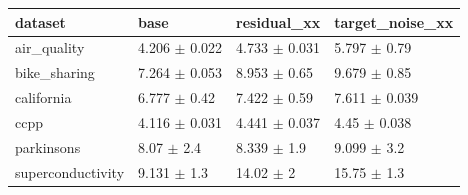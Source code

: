 \begin{tabular}{llll}
\toprule
dataset & base & residual\_xx & target\_noise\_xx \\
\midrule
air\_quality & 4.206 $\pm$ 0.022 & 4.733 $\pm$ 0.031 & 5.797 $\pm$ 0.79 \\
bike\_sharing & 7.264 $\pm$ 0.053 & 8.953 $\pm$ 0.65 & 9.679 $\pm$ 0.85 \\
california & 6.777 $\pm$ 0.42 & 7.422 $\pm$ 0.59 & 7.611 $\pm$ 0.039 \\
ccpp & 4.116 $\pm$ 0.031 & 4.441 $\pm$ 0.037 & 4.45 $\pm$ 0.038 \\
parkinsons & 8.07 $\pm$ 2.4 & 8.339 $\pm$ 1.9 & 9.099 $\pm$ 3.2 \\
superconductivity & 9.131 $\pm$ 1.3 & 14.02 $\pm$ 2 & 15.75 $\pm$ 1.3 \\
\bottomrule
\end{tabular}
